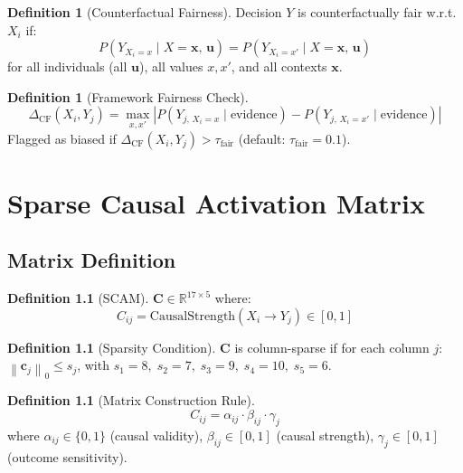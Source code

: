 \documentclass[12pt,a4paper]{report}
\theoremstyle{plain}
\theoremstyle{definition}
\newtheorem{definition}[theorem]{Definition}
\theoremstyle{remark}
\newcommand{\scam}{\mathbf{C}}
\newcommand{\taufair}{\tau_{\text{fair}}}
\newcommand{\norm}[1]{\left\|#1\right\|}
\newcommand{\R}{\mathbb{R}}
\begin{document}
\begin{definition}[Counterfactual Fairness]
\label{def:cf-fairness}
Decision $Y$ is counterfactually fair w.r.t.\ $X_i$ if:
\begin{equation}
    P(Y_{X_i = x} \mid X = \mathbf{x},\, \mathbf{u})
    = P(Y_{X_i = x'} \mid X = \mathbf{x},\, \mathbf{u})
\end{equation}
for all individuals (all $\mathbf{u}$),
all values $x, x'$, and all contexts $\mathbf{x}$.
\end{definition}

\begin{definition}[Framework Fairness Check]
\label{def:fairness-check}
\begin{equation}
    \Delta_{\text{CF}}(X_i, Y_j)
    = \max_{x, x'} \left|
      P(Y_{j,\, X_i=x} \mid \text{evidence})
      - P(Y_{j,\, X_i=x'} \mid \text{evidence})
      \right|
\end{equation}
Flagged as biased if $\Delta_{\text{CF}}(X_i, Y_j) > \taufair$
(default: $\taufair = 0.1$).
\end{definition}

\chapter{Sparse Causal Activation Matrix}
\label{ch:scam}

\section{Matrix Definition}

\begin{definition}[SCAM]
\label{def:scam}
$\scam \in \R^{17 \times 5}$ where:
\begin{equation}
    C_{ij} = \text{CausalStrength}(X_i \rightarrow Y_j)
    \in [0, 1]
\end{equation}
\end{definition}

\begin{definition}[Sparsity Condition]
\label{def:sparsity}
$\scam$ is column-sparse if for each column $j$:
$\norm{\mathbf{c}_j}_0 \leq s_j$,
with $s_1{=}8,\; s_2{=}7,\; s_3{=}9,\; s_4{=}10,\; s_5{=}6$.
\end{definition}

\begin{definition}[Matrix Construction Rule]
\label{def:matrix-rule}
\begin{equation}
    C_{ij} = \alpha_{ij} \cdot \beta_{ij} \cdot \gamma_j
\end{equation}
where $\alpha_{ij} \in \{0,1\}$ (causal validity),
$\beta_{ij} \in [0,1]$ (causal strength),
$\gamma_j \in [0,1]$ (outcome sensitivity).
\end{definition}
\end{document}
